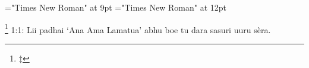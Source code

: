 \documentclass{article}
\begin{document}
 
\thispagestyle{empty} 
\font\footnotescriptureText="Times New Roman" at 9pt
\font\scriptureText="Times New Roman" at 12pt

  \footnote {‡} {1:1: Lii padhai ‘Ana Ama Lamatua’ abhu boe tu dara sasuri uuru
                  sèra.}
\end{document}
